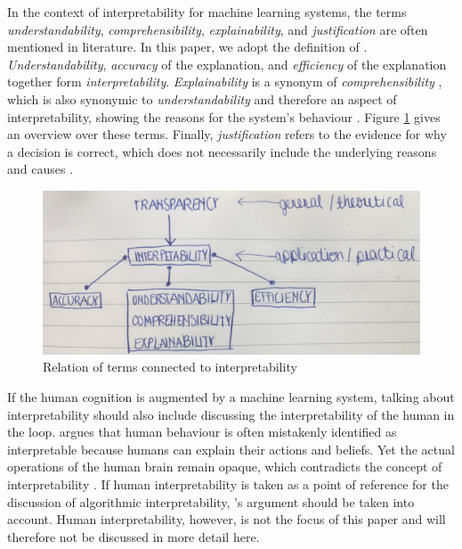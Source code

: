 In the context of interpretability for machine learning systems, the terms \textit{understandability}, \textit{comprehensibility}, \textit{explainability}, and \textit{justification} are often mentioned in literature. In this paper, we adopt the definition of \cite{ruping2006learning}. \textit{Understandability}, \textit{accuracy} of the explanation, and \textit{efficiency} of the explanation together form \textit{interpretability}. \textit{Explainability} is a synonym of \textit{comprehensibility} \cite{weihs2003combining}, which is also synonymic to \textit{understandability} \cite{bibal2016interpretability} and therefore an aspect of interpretability, showing the reasons for the system's behaviour \cite{gilpin2018explaining}. Figure \ref{fig:definitions} gives an overview over these terms. Finally, \textit{justification} refers to the evidence for why a decision is correct, which does not necessarily include the underlying reasons and causes \cite{biran2017explanation}.\newline
\begin{figure} [h]
	\centering
	\includegraphics[width=0.7\linewidth]{img/definitions}
	\caption{Relation of terms connected to interpretability}
	\label{fig:definitions}
\end{figure}
If the human cognition is augmented by a machine learning system, talking about interpretability should also include discussing the interpretability of the human in the loop. \cite{lipton2016mythos} argues that human behaviour is often mistakenly identified as interpretable because humans can explain their actions and beliefs. Yet the actual operations of the human brain remain opaque, which contradicts the concept of interpretability \cite{lipton2016mythos}. If human interpretability is taken as a point of reference for the discussion of algorithmic interpretability, \cite{lipton2016mythos}'s argument should be taken into account. Human interpretability, however, is not the focus of this paper and will therefore not be discussed in more detail here.\newline





